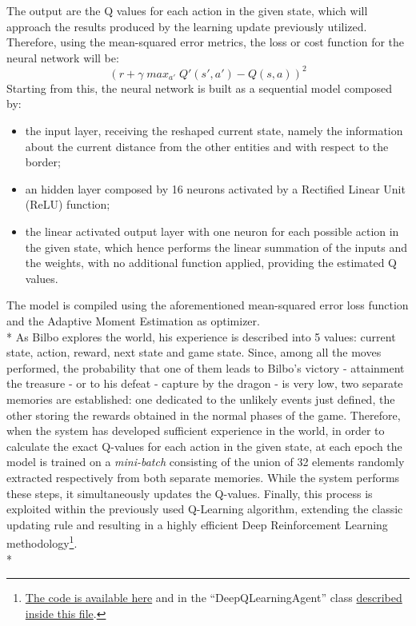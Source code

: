 The output are the Q values for each action in the given state, which will approach the results produced by the learning update previously utilized. Therefore, using the mean-squared error metrics, the loss or cost function for the neural network will be:
$$(r+\gamma\;max_{a'}\;Q'(s',a')-Q(s,a))^2$$
Starting from this, the neural network is built as a sequential model composed by:
\begin{itemize}[noitemsep, topsep=0ex]
  \item the input layer, receiving the reshaped current state, namely the information about the current distance from the other entities and with respect to the border;
  \item an hidden layer composed by 16 neurons activated by a Rectified Linear Unit (ReLU) function; 
  \item the linear activated output layer with one neuron for each possible action in the given state, which hence performs the linear summation of the inputs and the weights, with no additional function applied, providing the estimated Q values.
\end{itemize}
The model is compiled using the aforementioned mean-squared error loss function and the Adaptive Moment Estimation as optimizer.\\*
As Bilbo explores the world, his experience is described into 5 values: current state, action, reward, next state and game state. Since, among all the moves performed, the probability that one of them leads to Bilbo's victory - attainment the treasure - or to his defeat - capture by the dragon - is very low, two separate memories are established: one dedicated to the unlikely events just defined, the other storing the rewards obtained in the normal phases of the game. Therefore, when the system has developed sufficient experience in the world, in order to calculate the exact Q-values for each action in the given state, at each epoch the model is trained on a \textit{mini-batch} consisting of the union of 32 elements randomly extracted respectively from both separate memories. While the system performs these steps, it simultaneously updates the Q-values. Finally, this process is exploited within the previously used Q-Learning algorithm, extending the classic updating rule and resulting in a highly efficient Deep Reinforcement Learning methodology\footnote{\href{https://github.com/moiraghif/DragonHunting/blob/master/Bilbo\%20World/Bilbo_deep_feels.py}{The code is available here} and in the ``DeepQLearningAgent'' class \href{https://github.com/moiraghif/DragonHunting/blob/master/Bilbo\%20World/agents.py}{described inside this file}.}.\\*
